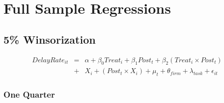 \documentclass[
]{article}
\begin{document}
\hypertarget{full-sample-regressions}{%
\section{Full Sample Regressions}\label{full-sample-regressions}}

\hypertarget{winsorization}{%
\subsection{5\% Winsorization}\label{winsorization}}

\[ \begin{aligned} DelayRate_{it} &=& \alpha+\beta_0 Treat_i + \beta_1 Post_t + \beta_2 (Treat_i \times Post_t)\\
&+&  X_i + (Post_t \times X_i) + \mu_t + \theta_{firm} + \lambda_{task}+ \epsilon_{it}
\end{aligned}\]

\hypertarget{one-quarter}{%
\subsubsection{One Quarter}\label{one-quarter}}
\end{document}
